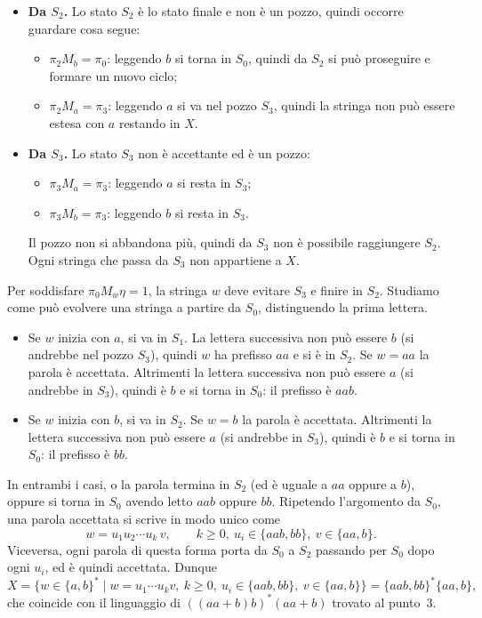 \begin{sol}
\begin{enumerate}
\begin{itemize}
\item \textbf{Da $S_2$.} Lo stato $S_2$ è lo stato finale e non è un pozzo, quindi occorre guardare cosa segue:
\begin{itemize}
\item $\pi_2 M_b = \pi_0$: leggendo $b$ si torna in $S_0$, quindi da $S_2$ si può proseguire e formare un nuovo ciclo;
\item $\pi_2 M_a = \pi_3$: leggendo $a$ si va nel pozzo $S_3$, quindi la stringa non può essere estesa con $a$ restando in $X$.
\end{itemize}

\item \textbf{Da $S_3$.} Lo stato $S_3$ non è accettante ed è un pozzo:
\begin{itemize}
\item $\pi_3 M_a = \pi_3$: leggendo $a$ si resta in $S_3$;
\item $\pi_3 M_b = \pi_3$: leggendo $b$ si resta in $S_3$.
\end{itemize}
Il pozzo non si abbandona più, quindi da $S_3$ non è possibile raggiungere $S_2$.
Ogni stringa che passa da $S_3$ non appartiene a $X$.
\end{itemize}
Per soddisfare $\pi_0 M_w \eta = 1$, la stringa $w$ deve evitare $S_3$ e finire in $S_2$.
Studiamo come può evolvere una stringa a partire da $S_0$, distinguendo la prima lettera.
\begin{itemize}
\item Se $w$ inizia con $a$, si va in $S_1$. La lettera successiva non può essere $b$
(si andrebbe nel pozzo $S_3$), quindi $w$ ha prefisso $aa$ e si è in $S_2$.
Se $w=aa$ la parola è accettata. Altrimenti la lettera successiva non può essere $a$
(si andrebbe in $S_3$), quindi è $b$ e si torna in $S_0$: il prefisso è $aab$.

\item Se $w$ inizia con $b$, si va in $S_2$. Se $w=b$ la parola è accettata.
Altrimenti la lettera successiva non può essere $a$ (si andrebbe in $S_3$),
quindi è $b$ e si torna in $S_0$: il prefisso è $bb$.
\end{itemize}
In entrambi i casi, o la parola termina in $S_2$ (ed è uguale a $aa$ oppure a $b$),
oppure si torna in $S_0$ avendo letto $aab$ oppure $bb$. Ripetendo l'argomento da $S_0$,
una parola accettata si scrive in modo unico come
\[
w=u_1u_2\cdots u_k\,v,\qquad k\ge0,\ u_i\in\{aab,bb\},\ v\in\{aa,b\}.
\]
Viceversa, ogni parola di questa forma porta da $S_0$ a $S_2$ passando per $S_0$
dopo ogni $u_i$, ed è quindi accettata. Dunque
\[
X=\{w\in\{a,b\}^*\mid w=u_1\cdots u_kv,\ k\ge0,\ u_i\in\{aab,bb\},\ v\in\{aa,b\}\}
=\{aab,bb\}^*\{aa,b\},
\]
che coincide con il linguaggio di $((aa+b)b)^*(aa+b)$ trovato al punto~3.

\end{enumerate}
\end{sol}
